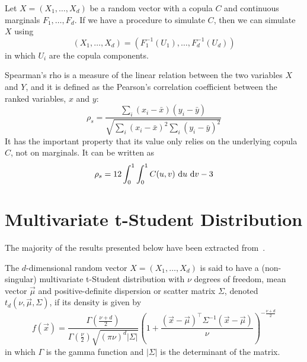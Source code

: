 \documentclass[11pt,fleqn]{book} %
\begin{document}
\begin{corollary}
	\label{cor:cop3}
	Let $X=(X_1, \dots, X_d)$ be a random vector with a copula $C$
	and continuous marginals $F_1, \dots, F_d$. If we have a
	procedure to simulate $C$, then we can simulate $X$ using
	\begin{displaymath}
		(X_1, \dots, X_d) = (F_1^{-1}(U_1), \dots, F_d^{-1}(U_d))
	\end{displaymath}
	in which $U_i$ are the copula components.
\end{corollary}

\begin{definition}
	Spearman's rho is a measure of the linear relation between the two 
	variables $X$ and $Y$, and it is defined as the Pearson's correlation 
	coefficient between the ranked variables, $x$ and $y$:
	\begin{displaymath}
		\rho_s = \frac{\displaystyle \sum_i (x_i-\bar{x}) (y_i-\bar{y})}
		{\sqrt{\displaystyle \sum_i (x_i-\bar{x})^2 \sum_i (y_i-\bar{y})^2}}
	\end{displaymath}
	It has the important property that its value only relies on the underlying 
	copula $C$, not on marginals. It can be written as
	\begin{displaymath}
		\rho_s = 12 \displaystyle \int_0^1 \int_0^1 C(u,v) \mathop{\,\mathrm{{}d}}\mathopen{} u \mathop{\,\mathrm{{}d}}\mathopen{} v -3
	\end{displaymath}
\end{definition}

\section{Multivariate t-Student Distribution}
\label{ap:mtsd}

The majority of the results presented below have been extracted 
from~\cite{kotz:2004,demarta:2005}.

\begin{definition}
	The $d$-dimensional random vector $X=(X_1,\dots,X_d)$ is said to have a 
	(non-singular) multivariate t-Student distribution with $\nu$ degrees of 
	freedom, mean vector $\vec{\mu}$ and positive-definite dispersion or 
	scatter matrix $\Sigma$, denoted $t_d(\nu,\vec{\mu},\Sigma)$, if its 
	density is given by
	\begin{displaymath}
		f(\vec{x})=\frac{\Gamma\left(\frac{\nu+d}{2}\right)}
		{\Gamma\left(\frac{\nu}{2}\right)\sqrt{(\pi \nu)^d |\Sigma|}}
		\left(
		1+ \frac{(\vec{x}-\vec{\mu})^\top\Sigma^{-1}(\vec{x}-\vec{\mu})}{\nu}
		\right)^{-\frac{\nu+d}{2}}
	\end{displaymath}
	in which $\Gamma$ is the gamma function and $|\Sigma|$ is the 
	determinant of the matrix.
\end{definition}
\end{document}
